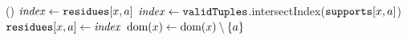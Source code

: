         \PROCEDURE \FilterDomains()     \label{line:filterDom:0}
       \label{line:filterDom:2}
             \label{line:filterDom:3}
              \STATE $\mathit{index} \leftarrow \texttt{residues}[x,a]$ \label{line:filterDom:res1}
               \label{line:filterDom:res2} %
                  \STATE $\mathit{index} \leftarrow \texttt{validTuples}$.intersectIndex($\texttt{supports}[x,a]$) \label{line:filterDom:4}
                   \label{line:filterDom:5}
                        \STATE $\texttt{residues}[x,a] \leftarrow \mathit{index}$ \label{line:filterDom:6}
                  \ELSE
                        \STATE $\text{dom}({x}) \leftarrow \text{dom}({x}) \setminus \left\{a\right\}$ \label{line:filterDom:7}
                  \ENDIF
              \ENDIF
             \ENDFOREACH
      
      \ENDFOREACH


